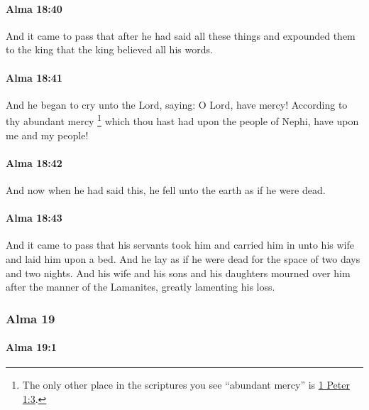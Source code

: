 		\paragraph{Alma 18:40} %
			\label{ALMA-18-40}

			And it came to pass that
			after he had said all these things and expounded them to the king
			that the king believed all his words.

		\paragraph{Alma 18:41} %
			\label{ALMA-18-41}

			And he began to cry unto the Lord, saying:
			O Lord, have mercy!
			According to thy abundant mercy%
				\footnote{%
					The only other place in the scriptures you see ``abundant mercy'' is \hyperref[1PETER-1-3]{1 Peter 1:3}.
					}
			which thou hast had upon the people of Nephi,
			have upon me and my people!

		\paragraph{Alma 18:42} %
			\label{ALMA-18-42}

			And now when he had said this,
			he fell unto the earth as if he were dead.

		\paragraph{Alma 18:43} %
			\label{ALMA-18-43}

			And it came to pass that his servants took him
			and carried him in unto his wife and laid him upon a bed.
			And he lay as if he were dead
			for the space of two days and two nights.
			And his wife and his sons and his daughters mourned over him
			after the manner of the Lamanites, greatly lamenting his loss.

	\subsubsection{Alma 19} %
		\label{ALMA-19}
		
		\paragraph{Alma 19:1} %
			\label{ALMA-19-1}

